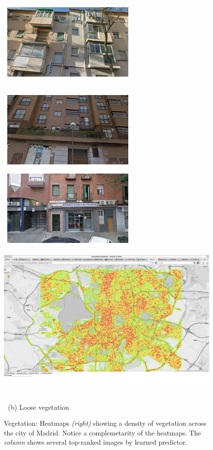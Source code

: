 \begin{figure}
\begin{minipage}{\linewidth}
\begin{minipage}{0.3\linewidth}
      \includegraphics[width=0.49\linewidth]{imgs/vege/mosaicsT1/mosaic0080.jpg}
      \\ \vspace{-3mm} \\
      \includegraphics[width=0.49\linewidth]{imgs/vege/mosaicsT1/mosaic0042.jpg}
      \includegraphics[width=0.49\linewidth]{imgs/vege/mosaicsT1/mosaic0048.jpg}
    \end{minipage}
    \begin{minipage}{0.7\linewidth}
      \includegraphics[trim= 350 150 250 150, clip=true, width=\linewidth]{imgs/vege/mapT1.jpg}
    \end{minipage}
  \end{minipage}
  \\
  $\;$\hspace{30mm} (b) Loose vegetation
  \\
  \caption{
    Vegetation: Heatmaps \emph{(right)} showing a density of vegetation across the city of Madrid. Notice a complemetarity of the heatmaps. The \emph{column} shows several top-ranked images by learned predictor.
  }
\end{figure}